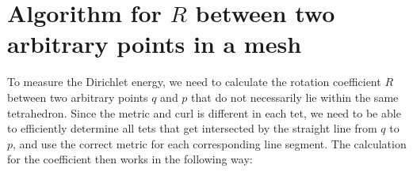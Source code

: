 \documentclass[../thesis.tex]{subfiles}
\begin{document}
\newcommand{\str}[1]{\textsc{#1}}
\newcommand{\var}[1]{\textit{#1}}
\newcommand{\op}[1]{\textsl{#1}}
\def \ifempty#1{\def\temp{#1} \ifx\temp\empty }
\newcommand{\msg}[2]{\ensuremath{\ifempty{#2} [\str{#1}] \else [\str{#1}, {#2}] \fi}}
\newcommand{\tup}[1]{\ensuremath{\langle #1 \rangle}}
\newcommand{\nil}{\ensuremath{\bot}}
\newcommand{\false}{\textsc{false}\xspace}
\newcommand{\true}{\textsc{true}\xspace}

\newcommand\ts{\var{ts}\xspace}
\newcommand{\CK}{\ensuremath{\mathcal{K}}\xspace}
\newcommand{\CP}{\ensuremath{\mathcal{P}}\xspace}
\newcommand{\CQ}{\ensuremath{\mathcal{Q}}\xspace}

\chapter{Algorithm for $R$ between two arbitrary points in a mesh}
\label{ch:algorithm}
To measure the Dirichlet energy, we need to calculate the rotation coefficient $R$
between two arbitrary points $q$ and $p$ that do not necessarily lie within the same 
tetrahedron. Since the metric and curl is different in each tet, we need to be
able to efficiently determine all tets that get intersected by the straight
line from $q$ to $p$, and use the correct metric for each corresponding
line segment.
The calculation for the coefficient then works in the following way:
\end{document}
